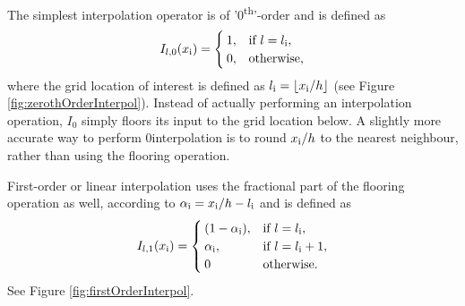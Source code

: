 The simplest interpolation operator is of '0\textsuperscript{th}'-order and is defined as
\begin{equation}\label{eq:zerothOrderI}
    I_{l,0}(x_{\text{i}}) = \begin{cases}
        1, & \text{if}\ l = l_{\text{i}},\\
        0, & \text{otherwise},
    \end{cases}
\end{equation}
where the grid location of interest is defined as $l_\itxt = \floor[x_\itxt / h]$ (see Figure \ref{fig:zerothOrderInterpol}). Instead of actually performing an interpolation operation, $I_0$ simply floors its input to the grid location below. 
%
% 
%
A slightly more accurate way to perform 0\thOrder interpolation is to round $x_{\text{i}}/h$ to the nearest neighbour, rather than using the flooring operation. 

First-order or linear interpolation uses the fractional part of the flooring operation as well, according to $\alpha_{\text{i}} = x_{\text{i}} / h - l_{\text{i}}$ and is defined as
\begin{equation}\label{eq:firstOrderI}
    I_{l,1}(x_{\text{i}}) = \begin{cases}
        (1-\alpha_{\text{i}}), & \text{if}\ l = l_{\text{i}},\\
        \alpha_{\text{i}} , & \text{if}\ l = l_{\text{i}} + 1,\\
        0 & \text{otherwise.}
    \end{cases}
\end{equation}
See Figure \ref{fig:firstOrderInterpol}. 

